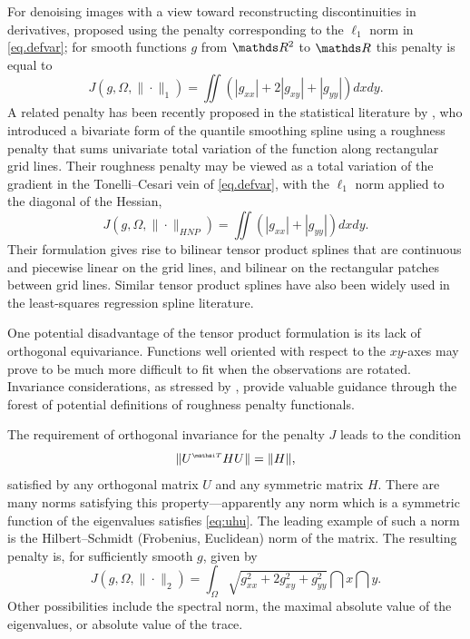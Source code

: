 For denoising images with a view toward reconstructing discontinuities in
derivatives,  proposed using the penalty corresponding
to the $\ell_1$ norm in \eqref{eq.defvar}; for smooth functions $g$
from $\RR^2$ to $\RR$ this penalty is equal to
\begin{equation}
\label{eq.stv}
J(g, \varOmega, \| \cdot \|_1 )
        = \iint (| g_{xx} | + 2 | g_{xy}| + | g_{yy} |) dx dy.
\end{equation}
A related penalty has been recently proposed in the statistical literature by
, who introduced a bivariate form of the
quantile smoothing spline using a roughness penalty that sums
univariate total variation of the function along rectangular grid
lines. Their roughness penalty may be viewed as a total variation of
the gradient in the Tonelli--Cesari vein of \eqref{eq.defvar}, with the
$\ell_1$ norm applied to the diagonal of the Hessian,
\begin{equation}
\label{eq.hnptv}
J(g, \varOmega, \| \cdot \|_{HNP})
        = \iint ( | g_{xx} | + | g_{yy} | ) dx dy.
\end{equation}
Their formulation
gives rise to bilinear tensor product splines that are continuous and
piecewise linear on the grid lines, and bilinear on the rectangular
patches between grid lines. Similar tensor product splines have also
been widely used in the least-squares regression spline literature.
 
One potential disadvantage of the tensor product formulation
is its lack of orthogonal equivariance. Functions well
oriented with respect to the $xy$-axes may prove to be much more
difficult to fit when the observations are rotated. Invariance
considerations, as stressed by , provide
valuable guidance through the forest of potential definitions 
of roughness penalty functionals.

The requirement of orthogonal invariance for the penalty $J$ leads
to the condition
\begin{equation}
\label{eq:uhu}
\| U\trans H U \| = \| H \|,
\end{equation}
satisfied by any orthogonal matrix $U$ and any symmetric matrix $H$.
There are many norms satisfying this property---apparently any norm
which is a symmetric function of the eigenvalues satisfies
\eqref{eq:uhu}.
The leading example of such a norm is the Hilbert--Schmidt (Frobenius,
Euclidean) norm of the matrix. The resulting penalty is, for
sufficiently smooth $g$, given by
\begin{equation*}
J(g, \varOmega, \| \cdot \|_2) = \int_\varOmega
        \sqrt{g^2_{xx} + 2g^2_{xy} + g^2_{yy}} \dint x \dint y.
\end{equation*}
Other possibilities include the spectral norm, the maximal absolute
value of the eigenvalues, or absolute value of the trace.
 
